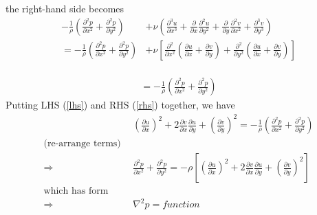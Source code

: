 \documentclass[11pt]{article}
\newcommand{\D}[2][]{\frac{\partial#1}{\partial#2}}
\begin{document}
the right-hand side becomes
\begin{align}
-\frac{1}{\rho} \left( \D[^2p]{x^2} + \D[^2p]{y^2} \right)
&+\nu \left( \D[^3u]{x^3} + \D{x} \D[^2u]{y^2} + \D{y} \D[^2v]{x^2} + \D[^3v]{y^3} \right)
	\nonumber \\ \nonumber
= -\frac{1}{\rho} \left( \D[^2p]{x^2} + \D[^2p]{y^2} \right)
&+ \nu \left[
  \D[^2]{x^2} \left( \D[u]{x} + \D[v]{y} \right)
+ \D[^2]{y^2} \left( \D[u]{x} + \D[v]{y} \right)
  \right]
  \label{rhs}
\end{align}
  \\
\begin{align}
= -\frac{1}{\rho} \left( \D[^2p]{x^2} + \D[^2p]{y^2} \right)
\end{align}
Putting LHS (\ref{lhs}) and RHS (\ref{rhs}) together, we have
\begin{align}
&\left(\D[u]{x}\right)^2 + 2\D[v]{x}\D[u]{y} + \left(\D[v]{y}\right)^2
=
-\frac{1}{\rho} \left( \D[^2p]{x^2} + \D[^2p]{y^2} \right)
\nonumber \\
\text{(re-arrange terms)}~~ \nonumber \\
\Rightarrow~~~&\D[^2p]{x^2} + \D[^2p]{y^2} =
- \rho \left[ \left(\D[u]{x}\right)^2 + 2\D[v]{x}\D[u]{y} + \left(\D[v]{y}\right)^2 \right]
\label{poisson_continuous_2-component} \\
\text{which has form}& \nonumber \\ \nonumber
\Rightarrow~~~&\nabla^2 p = function
\end{align}
\end{document}
